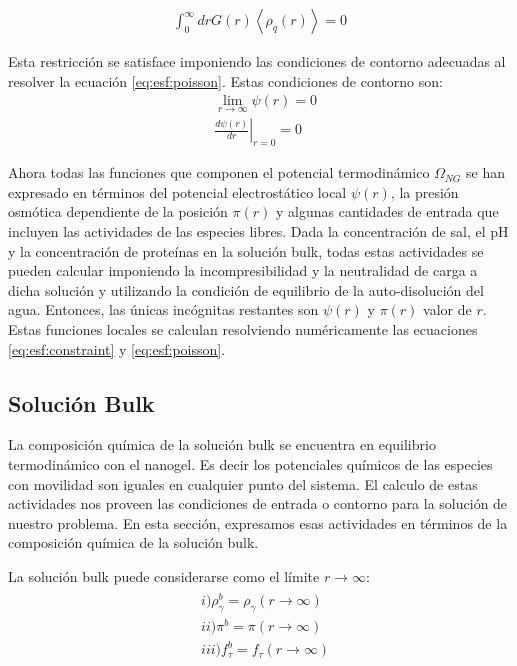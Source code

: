 \begin{align}
	\int_0^\infty{drG(r) \left<\rho_q(r)\right>} = 0
\end{align}

Esta restricci\'on se satisface imponiendo las condiciones de contorno adecuadas al resolver la ecuaci\'on \ref{eq:esf:poisson}. Estas condiciones de contorno son:
\begin{align}
	&  \lim_{r\to\infty}\psi(r) = 0 \\
	&  \left.\frac{d\psi(r)}{dr}\right|_{r=0} = 0
	\label{eq:esf:contorno}
	\end{align}
	

Ahora todas las funciones que componen el potencial termodin\'amico $\Omega_{NG}$ se han expresado en t\'erminos del potencial electrost\'atico local $\psi(r)$, la presi\'on osm\'otica dependiente de la posici\'on $\pi(r)$ y algunas cantidades de entrada que incluyen las actividades de las especies libres.
Dada la concentraci\'on de sal, el pH y la concentraci\'on de prote\'inas en la soluci\'on bulk, todas estas actividades se pueden calcular imponiendo la incompresibilidad y la neutralidad de carga a dicha soluci\'on y utilizando la condici\'on de equilibrio de la auto-disoluci\'on del agua.
Entonces, las \'unicas inc\'ognitas restantes son $\psi(r)$ y $\pi(r)$ valor de $r$.
Estas funciones locales se calculan resolviendo num\'ericamente las ecuaciones \ref{eq:esf:constraint} y \ref{eq:esf:poisson}.
 

\subsection{Soluci\'on Bulk}\label{sec:esf:bulk}

La composici\'on qu\'imica de la soluci\'on bulk se encuentra en equilibrio termodin\'amico con el nanogel. Es decir los potenciales qu\'imicos de las especies con movilidad son iguales en cualquier punto del sistema. 
El calculo de estas actividades nos proveen  las condiciones de entrada o contorno para la soluci\'on de nuestro problema.
En esta secci\'on, expresamos esas actividades en t\'erminos de la composici\'on qu\'imica de la soluci\'on bulk.

La soluci\'on bulk  puede considerarse como el l\'imite $r \rightarrow \infty$:
\begin{align}
	\begin{aligned}
		& i)\rho^b_\gamma =\rho_\gamma (r \rightarrow \infty) \\
		& ii) \pi^b = \pi(r \rightarrow \infty) \\
		& iii) f_\tau^b = f_\tau(r \rightarrow \infty)
	\end{aligned}
\end{align}

